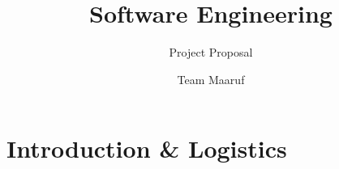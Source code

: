 \documentclass[answers]{exam}
\title{Software Engineering}
\author{Project Proposal}
\date{Team Maaruf}
\begin{document}
\maketitle
\newpage
\tableofcontents


\newpage
\section{Introduction \& Logistics}
\paragraph{}
\end{document}
